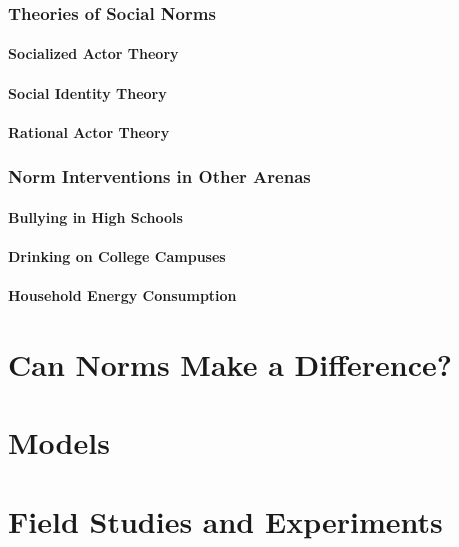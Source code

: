 \documentclass[rutwik_proposal.tex]{subfiles}
\begin{document}
\subsection{Theories of Social Norms}\label{subsec:theories}

\subsubsection{Socialized Actor Theory}\label{subsubsec:socialization}

\subsubsection{Social Identity Theory}\label{subsubsec:socidentity}

\subsubsection{Rational Actor Theory}\label{subsubsec:rationality}

\subsection{Norm Interventions in Other Arenas}\label{subsec:interventions}

\subsubsection{Bullying in High Schools}\label{bullying}

\subsubsection{Drinking on College Campuses}\label{drinking}

\subsubsection{Household Energy Consumption}\label{electricity}

\chapter{Can Norms Make a Difference?}\label{ch:usefulness}

\chapter{Models}\label{ch:models}

\chapter{Field Studies and Experiments}\label{ch:field}
\end{document}
